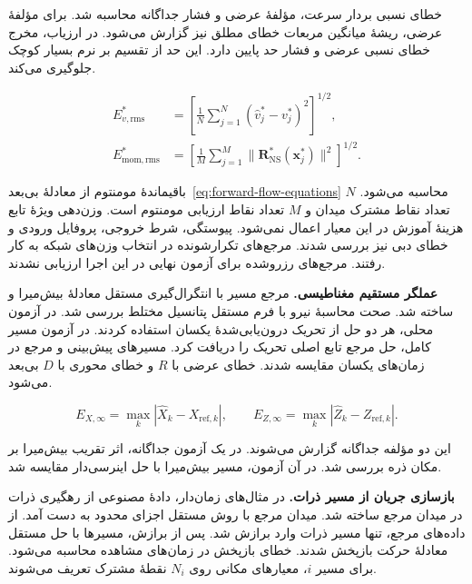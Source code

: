 خطای نسبی بردار سرعت، مؤلفهٔ عرضی و فشار جداگانه محاسبه شد.
برای مؤلفهٔ عرضی، ریشهٔ میانگین مربعات خطای مطلق نیز گزارش می‌شود.
در ارزیاب، مخرج خطای نسبی عرضی و فشار حد پایین دارد.
این حد از تقسیم بر نرم بسیار کوچک جلوگیری می‌کند.

\begin{equation}
\begin{aligned}
E_{v,\mathrm{rms}}^*
&=\left[\frac1N\sum_{j=1}^N(\widehat v_j^*-v_j^*)^2\right]^{1/2},\\
E_{\mathrm{mom,rms}}^*
&=\left[\frac1M\sum_{j=1}^M
 \|\mathbf R_{\mathrm{NS}}^*(\mathbf x_j^*)\|^2\right]^{1/2}.
\end{aligned}
\label{eq:validation-forward-flow-rms}
\end{equation}

باقیماندهٔ مومنتوم از معادلهٔ بی‌بعد~\eqref{eq:forward-flow-equations} محاسبه می‌شود.
$N$ تعداد نقاط مشترک میدان و $M$ تعداد نقاط ارزیابی مومنتوم است.
وزن‌دهی ویژهٔ تابع هزینهٔ آموزش در این معیار اعمال نمی‌شود.
پیوستگی، شرط خروجی، پروفایل ورودی و خطای دبی نیز بررسی شدند.
مرجع‌های تکرارشونده در انتخاب وزن‌های شبکه به کار رفتند.
مرجع‌های رزروشده برای آزمون نهایی در این اجرا ارزیابی نشدند.

\textbf{عملگر مستقیم مغناطیسی.}
مرجع مسیر با انتگرال‌گیری مستقل معادلهٔ بیش‌میرا و  ساخته شد.
صحت محاسبهٔ نیرو با فرم مستقل پتانسیل مختلط بررسی شد.
در آزمون محلی، هر دو حل از تحریک درون‌یابی‌شدهٔ یکسان استفاده کردند.
در آزمون مسیر کامل، حل مرجع تابع اصلی تحریک را دریافت کرد.
مسیرهای پیش‌بینی و مرجع در زمان‌های یکسان مقایسه شدند.
خطای عرضی با $R$ و خطای محوری با $D$ بی‌بعد می‌شود.

\begin{equation}
E_{X,\infty}=\max_k|\widehat X_k-X_{\mathrm{ref},k}|,
\qquad
E_{Z,\infty}=\max_k|\widehat Z_k-Z_{\mathrm{ref},k}|.
\label{eq:validation-forward-magnetic-errors}
\end{equation}

این دو مؤلفه جداگانه گزارش می‌شوند.
در یک آزمون جداگانه، اثر تقریب بیش‌میرا بر مکان ذره بررسی شد.
در آن آزمون، مسیر بیش‌میرا با حل اینرسی‌دار  مقایسه شد.

\textbf{بازسازی جریان از مسیر ذرات.}
در مثال‌های زمان‌دار، دادهٔ مصنوعی از رهگیری ذرات در میدان مرجع ساخته شد.
میدان مرجع با روش مستقل اجزای محدود به دست آمد.
از داده‌های مرجع، تنها مسیر ذرات وارد برازش شد.
پس از برازش، مسیرها با حل مستقل معادلهٔ حرکت بازپخش شدند.
خطای بازپخش در زمان‌های مشاهده محاسبه می‌شود.
برای مسیر $i$، معیارهای مکانی روی $N_i$ نقطهٔ مشترک تعریف می‌شوند.

